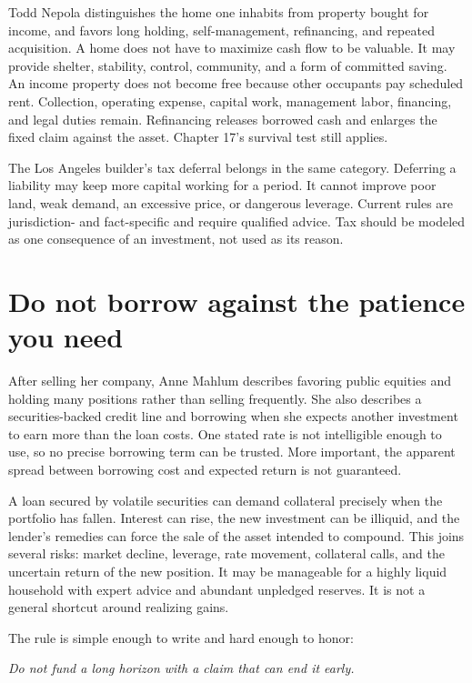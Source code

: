 Todd Nepola distinguishes the home one inhabits from property bought for
income, and favors long holding, self-management, refinancing, and repeated
acquisition. A home does not have to maximize cash flow to be valuable. It may
provide shelter, stability, control, community, and a form of committed saving.
An income property does not become free because other occupants pay scheduled
rent. Collection, operating expense, capital work, management labor, financing,
and legal duties remain. Refinancing releases borrowed cash and enlarges the
fixed claim against the asset. Chapter 17's survival test still applies.

The Los Angeles builder's tax deferral belongs in the same category. Deferring
a liability may keep more capital working for a period. It cannot improve poor
land, weak demand, an excessive price, or dangerous leverage. Current rules are
jurisdiction- and fact-specific and require qualified advice. Tax should be
modeled as one consequence of an investment, not used as its reason.

\section{Do not borrow against the patience you need}

After selling her company, Anne Mahlum describes favoring public equities and
holding many positions rather than selling frequently. She also describes a
securities-backed credit line and borrowing when she expects another investment
to earn more than the loan costs. One stated rate is not intelligible enough to
use, so no precise borrowing term can be trusted. More important, the apparent
spread between borrowing cost and expected return is not guaranteed.

A loan secured by volatile securities can demand collateral precisely when the
portfolio has fallen. Interest can rise, the new investment can be illiquid,
and the lender's remedies can force the sale of the asset intended to compound.
This joins several risks: market decline, leverage, rate movement, collateral
calls, and the uncertain return of the new position. It may be manageable for
a highly liquid household with expert advice and abundant unpledged reserves.
It is not a general shortcut around realizing gains.

The rule is simple enough to write and hard enough to honor:

\begin{center}
\emph{Do not fund a long horizon with a claim that can end it early.}
\end{center}

